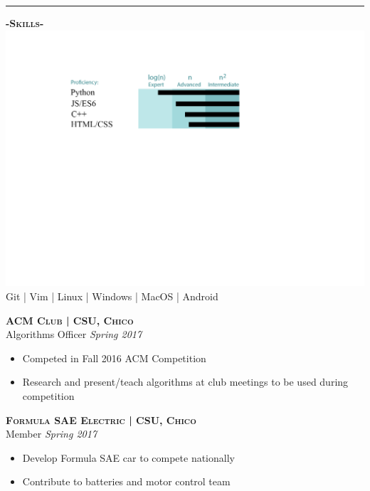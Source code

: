 \documentclass[12pt]{article}
\begin{document}
\noindent\rule{19cm}{0.4pt}
\bigskip
\begin{multicols}{2}
\begin{center}
\textbf{\textsc{-Skills-}}
\includegraphics[trim={2.8cm 7cm 2cm 2cm},clip]{ResumePic}
\smallskip
\footnotesize
\color{gray}Git | Vim | Linux | Windows | MacOS | Android
\end{center}
\columnbreak
\center
\footnotesize
\color{black}\textsc{\textbf{ACM Club | CSU, Chico}}\\

\color{Cerulean}Algorithms Officer \hfill \color{gray}\textit{Spring 2017}\\
\begin{itemize}
\setlength{\itemsep}{0pt}
	\item Competed in Fall 2016 ACM Competition
	\item Research and present/teach algorithms at club meetings to be used during competition
\end{itemize}

\center
\color{black}\textsc{\textbf{Formula SAE Electric | CSU, Chico}}\\
\color{Cerulean}Member \hfill \color{gray}\textit{Spring 2017}

\begin{itemize}
\setlength{\itemsep}{0pt}
	\item Develop Formula SAE car to compete nationally
	\item Contribute to batteries and motor control team
\end{itemize}


\end{multicols}
\end{document}
